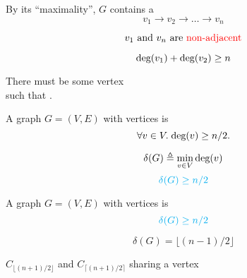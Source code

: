 \begin{frame}{}
  \begin{center}
    By its ``maximality'', $G$ contains a 
    \[
      v_{1} \to v_{2} \to \dots \to v_{n}
    \]

    \pause
    \vspace{-0.60cm}
    \[
      v_{1} \text{ and } v_{n} \text{ are \textcolor{red}{non-adjacent}}
    \]

    \pause
    \vspace{-0.60cm}
    \[
      \text{deg}(v_{1}) + \text{deg}(v_{2}) \ge n
    \]

    \pause
    There must be some vertex  \\[3pt]
    such that .
  \end{center}
\end{frame}

\begin{frame}{}
  \begin{theorem}
    A  graph $G = (V, E)$
    with  vertices is 
    \[
      \forall v \in V.\; \text{deg}(v) \ge n/2.
    \]
  \end{theorem}

  \pause
  \[
    \delta(G) \triangleq \min_{v \in V} \text{deg}(v)
  \]
  \[
    \textcolor{cyan}{\delta(G) \ge n/2}
  \]

  \pause
\end{frame}

\begin{frame}{}
  \begin{theorem}
    A  graph $G = (V, E)$
    with  vertices is 
    \[
      \textcolor{cyan}{\delta(G) \ge n/2}
    \]
  \end{theorem}

  \pause
  \[
    \delta(G) = \lfloor (n-1)/2 \rfloor
  \]

  \pause
  \vspace{0.30cm}
  \begin{center}
    $C_{\lfloor (n + 1)/ 2 \rfloor}$ and $C_{\lceil (n+1)/2 \rceil}$
    sharing a vertex
  \end{center}
\end{frame}
